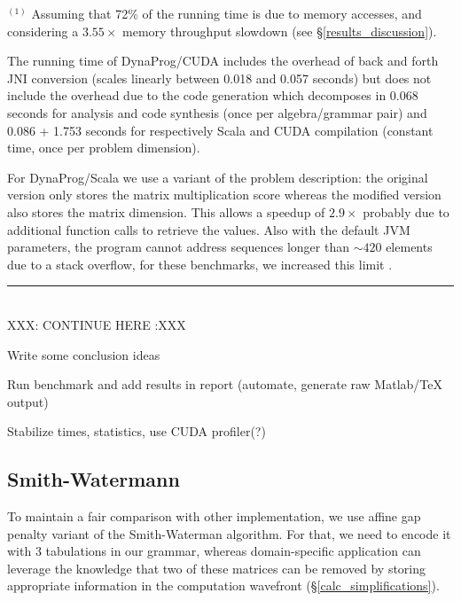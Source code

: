 $^{(1)}$ Assuming that 72\% of the running time is due to memory accesses, and considering a $3.55\times$ memory throughput slowdown (see \S\ref{results_discussion}). %

The running time of DynaProg/CUDA includes the overhead of back and forth JNI conversion (scales linearly between 0.018 and 0.057 seconds) but does not include the overhead due to the code generation which decomposes in 0.068 seconds for analysis and code synthesis (once per algebra/grammar pair) and 0.086 + 1.753 seconds for respectively Scala and CUDA compilation (constant time, once per problem dimension).

For DynaProg/Scala we use a variant of the problem description: the original version only stores the matrix multiplication score whereas the modified version also stores the matrix dimension. This allows a speedup of $2.9\times$ probably due to additional function calls to retrieve the values. Also with the default JVM parameters, the program cannot address sequences longer than $\sim 420$ elements due to a stack overflow, for these benchmarks, we increased this limit	.

{\center\color{red} \noindent\rule{16cm}{0.4pt} \\ XXX: CONTINUE HERE :XXX \\}

{\color{red}\ol
\item Write some conclusion ideas
\item Run benchmark and add results in report (automate, generate raw Matlab/TeX output)
\item Stabilize times, statistics, use CUDA profiler(?)
\ole}

\subsection{Smith-Watermann}
To maintain a fair comparison with other implementation, we use affine gap penalty variant of the Smith-Waterman algorithm. For that, we need to encode it with 3 tabulations in our grammar, whereas domain-specific application can leverage the knowledge that two of these matrices can be removed by storing appropriate information in the computation wavefront (\S\ref{calc_simplifications}).

